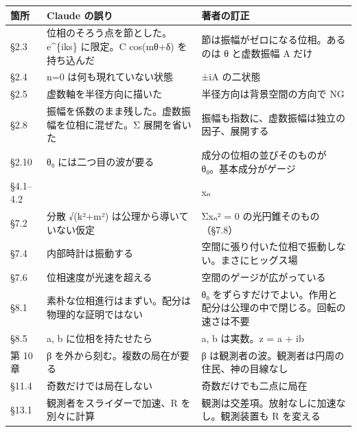 \documentclass[
  a4paper,
]{ltjsarticle}
\newcounter{none} %
\begin{document}
{\def\LTcaptype{none} %
\begin{longtable}[]{@{}
  >{\raggedright\arraybackslash}p{}
  >{\raggedright\arraybackslash}p{}
  >{\raggedright\arraybackslash}p{}@{}}
\toprule\noalign{}
\begin{minipage}[b]{\linewidth}\raggedright
箇所
\end{minipage} & \begin{minipage}[b]{\linewidth}\raggedright
Claude の誤り
\end{minipage} & \begin{minipage}[b]{\linewidth}\raggedright
著者の訂正
\end{minipage} \\
\midrule\noalign{}
\endhead
\bottomrule\noalign{}
\endlastfoot
§2.3 & 位相のそろう点を節とした。e\^{}\{iks\} に限定。C cos(mθ+δ)
を持ち込んだ & 節は振幅がゼロになる位相。あるのは θ と虚数振幅 A だけ \\
§2.4 & n=0 は何も現れていない状態 & ±iA の二状態 \\
§2.5 & 虚数軸を半径方向に描いた & 半径方向は背景空間の方向で NG \\
§2.8 & 振幅を係数のまま残した。虚数振幅を位相に混ぜた。Σ 展開を省いた &
振幅も指数に、虚数振幅は独立の因子、展開する \\
§2.10 & θ₀ には二つ目の波が要る & 成分の位相の並びそのものが
θ₀。基本成分がゲージ \\
§4.1--4.2 & & xₙ \\
§7.2 & 分散 √(k²+m²) は公理から導いていない仮定 & Σxₙ² = 0
の光円錐そのもの（§7.8） \\
§7.4 & 内部時計は振動する &
空間に張り付いた位相で振動しない。まさにヒッグス場 \\
§7.6 & 位相速度が光速を超える & 空間のゲージが広がっている \\
§8.1 & 素朴な位相進行はまずい。配分は物理的な証明ではない & θ₀
をずらすだけでよい。作用と配分は公理の中で閉じる。回転の速さは不要 \\
§8.5 & a, b に位相を持たせたら & a, b は実数。z = a + ib \\
第 10 章 & β を外から刻む。複数の局在が要る & β
は観測者の波。観測者は円周の住民、神の目線なし \\
§11.4 & 奇数だけでは局在しない & 奇数だけでも二点に局在 \\
§13.1 & 観測者をスライダーで加速、R を別々に計算 &
観測は交差項。放射なしに加速なし。観測装置も R を変える \\

\end{longtable}}
\end{document}
